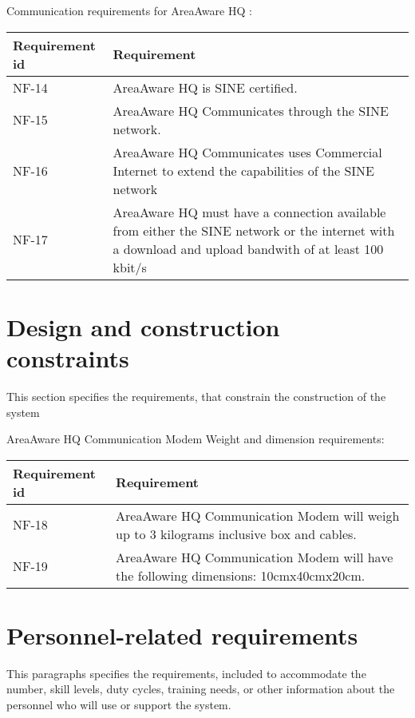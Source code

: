 Communication requirements for AreaAware HQ :
\begin{longtable}{| p{3.2cm} |  p{10cm} | }
	\hline
	\textbf{Requirement id} &  \textbf{Requirement } \\
	\hline
	NF-14 & AreaAware HQ is SINE certified.  \\
	\hline
	NF-15 & AreaAware HQ Communicates through the SINE network. \\
	\hline
	NF-16 & AreaAware HQ Communicates uses Commercial Internet to extend the capabilities of the SINE network \\
	\hline
	NF-17 & AreaAware HQ must have a connection available from either the SINE network or the internet with a download and upload bandwith of at least 100 kbit/s \\
	\hline
\end{longtable}




\label{sec_nonFunc5}
\section{Design and construction constraints}
This section specifies the requirements, that constrain the construction of the system

AreaAware HQ Communication Modem Weight and dimension requirements:
\begin{longtable}{| p{3.2cm} |  p{10cm} | }
	\hline
	\textbf{Requirement id} &  \textbf{Requirement } \\
	\hline
	NF-18 & AreaAware HQ Communication Modem will weigh up to 3 kilograms inclusive box and cables.  \\
	\hline
	NF-19 & AreaAware HQ Communication Modem will have the following dimensions: 10cmx40cmx20cm. \\
	\hline
\end{longtable}

\label{sec_nonFunc6}
\section{Personnel-related requirements}
This paragraphs specifies the requirements, included to accommodate the number, skill levels, duty cycles, training needs, or other information about the personnel who will use or support the system.


